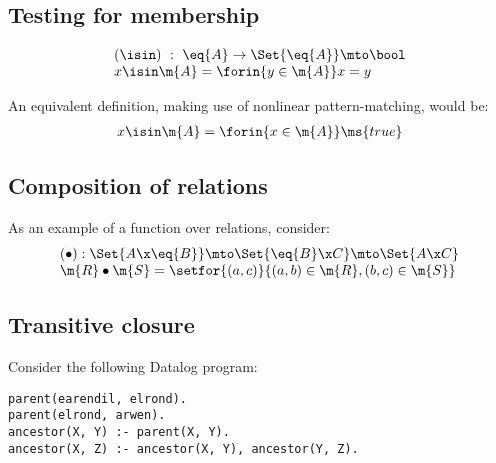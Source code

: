 \documentclass[preprint]{sigplanconf}
\begin{document}
\TODO

\subsection{Testing for membership}


\[\begin{array}{l}
(\isin) ~:~ \eq{A} \to \Set{\eq{A}} \mto \bool\\
x \isin \m{A} = \forin{y \in \m{A}} x = y
\end{array}\]


An equivalent definition, making use of nonlinear pattern-matching, would be:
\[\begin{array}{l}
x \isin \m{A} = \forin{x \in \m{A}} \ms{true}
\end{array}\]


\subsection{Composition of relations}

 

\noindent As an example of a function over relations, consider:
\[\begin{array}{l}
(\bullet) : \Set{A \x \eq{B}} \mto \Set{\eq{B} \x C} \mto \Set{A \x C}\\
\m{R} \bullet \m{S} = \setfor{(a,c)}{(a,b) \in \m{R}, (b,c) \in \m{S}}
\end{array}\]


\subsection{Transitive closure}

Consider the following Datalog program:
\begin{verbatim}
parent(earendil, elrond).
parent(elrond, arwen).
ancestor(X, Y) :- parent(X, Y).
ancestor(X, Z) :- ancestor(X, Y), ancestor(Y, Z).
\end{verbatim}
\end{document}
